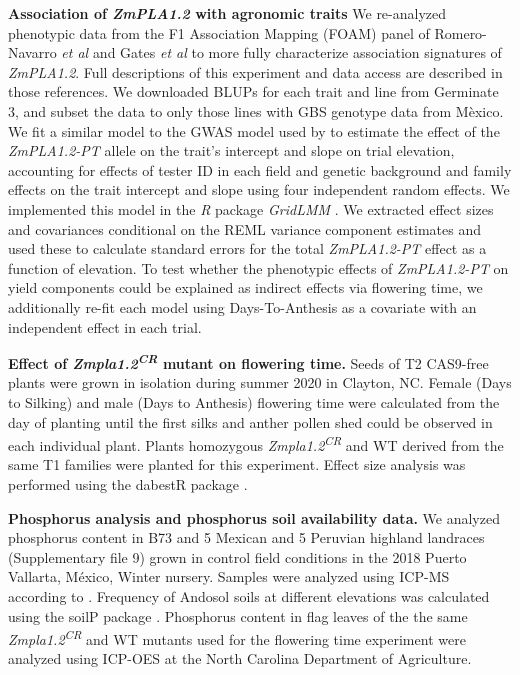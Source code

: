 \documentclass[9pt,twocolumn,twoside,lineno]{BioRxiv}
\begin{document}
\textbf{Association of \textit{ZmPLA1.2} with agronomic traits}
We re-analyzed phenotypic data from the F1 Association Mapping (FOAM) panel of Romero-Navarro \textit{et al} \cite{Romero_Navarro2017-cn} and Gates \textit{et al} \cite{Gates2019-xu} to more fully characterize association signatures of \textit{ZmPLA1.2}. 
Full descriptions of this experiment and data access are described in those references. 
We downloaded BLUPs for each trait and line from Germinate 3, and subset the data to only those lines with GBS genotype data from M\`exico. 
We fit a similar model to the GWAS model used by \cite{Gates2019-xu} to estimate the effect of the \textit{ZmPLA1.2-PT} allele on the trait's intercept and slope on trial elevation, accounting for effects of tester ID in each field and genetic background and family effects on the trait intercept and slope using four independent random effects. 
We implemented this model in the \textit{R} package \textit{GridLMM} \cite{Runcie2019-Gr}. 
We extracted effect sizes and covariances conditional on the REML variance component estimates and used these to calculate standard errors for the total \textit{ZmPLA1.2-PT} effect as a function of elevation. 
To test whether the phenotypic effects of \textit{ZmPLA1.2-PT} on yield components could be explained as indirect effects via flowering time, we additionally re-fit each model using Days-To-Anthesis as a covariate with an independent effect in each trial.

\textbf{Effect of \textit{Zmpla1.2\textsuperscript{CR}} mutant on flowering time.}
Seeds of T2 CAS9-free plants were grown in isolation during summer 2020 in Clayton, NC. 
Female (Days to Silking) and male (Days to Anthesis) flowering time were calculated from the day of planting until the first silks and anther pollen shed could be observed in each individual plant. 
Plants homozygous \textit{Zmpla1.2\textsuperscript{CR}} and WT derived from the same T1 families were planted for this experiment. 
Effect size analysis was performed using the dabestR package \cite{Ho2019-yl}.

\textbf{Phosphorus analysis and phosphorus soil availability data.}
We analyzed phosphorus content in B73 and 5 Mexican  and 5 Peruvian highland landraces (Supplementary file 9) grown in control field conditions in the 2018 Puerto Vallarta, M\'exico, Winter nursery. 
Samples were analyzed using ICP-MS according to \cite{Baxter2014-ch}. 
Frequency of Andosol soils at different elevations was calculated using the soilP package \cite{Rodriguez-Zapata2018-vz}. %
Phosphorus content in flag leaves of the the same \textit{Zmpla1.2\textsuperscript{CR}} and WT mutants used for the flowering time experiment were analyzed using ICP-OES at the North Carolina Department of Agriculture.
\end{document}

